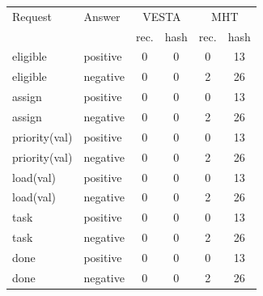 \begin{tabular}{llcccc}
\toprule
Request & Answer & \multicolumn{2}{c}{VESTA} & \multicolumn{2}{c}{MHT}\\
 & & rec. & hash & rec. & hash\\
\midrule
eligible & positive & 0 & 0 & 0 & 13\\
eligible & negative & 0 & 0 & 2 & 26\\
assign & positive & 0 & 0 & 0 & 13\\
assign & negative & 0 & 0 & 2 & 26\\
priority(val) & positive & 0 & 0 & 0 & 13\\
priority(val) & negative & 0 & 0 & 2 & 26\\
load(val) & positive & 0 & 0 & 0 & 13\\
load(val) & negative & 0 & 0 & 2 & 26\\
task & positive & 0 & 0 & 0 & 13\\
task & negative & 0 & 0 & 2 & 26\\
done & positive & 0 & 0 & 0 & 13\\
done & negative & 0 & 0 & 2 & 26\\
\bottomrule
\end{tabular}
